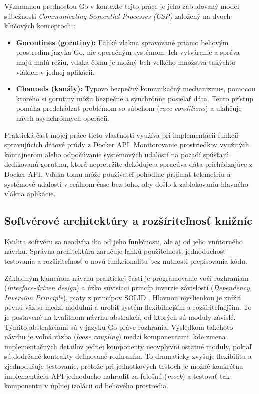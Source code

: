 \documentclass[
 program=infpvs,
  language=slovak,
  figures=false,
  tables=false,
  sourcecodes,
  glossaries,
  index
]{kidiplom}
\begin{document}
{Významnou prednosťou Go v kontexte tejto práce je jeho zabudovaný model súbežnosti \textit{Communicating Sequential Processes (CSP)} \cite{hoare-csp} založený na dvoch kľučových konceptoch \cite{go-concurrency}:
\begin{itemize}
    \item \textbf{Goroutines (gorutiny):} Ľahké vlákna spravované priamo behovým prostredím jazyka Go, nie operačným systémom. Ich vytváranie a správa majú malú réžiu, vďaka čomu je možný beh veľkého množstva takýchto vlákien v jednej aplikácii.
    \item \textbf{Channels (kanály):} Typovo bezpečný komunikačný mechanizmus, pomocou ktorého si gorutiny môžu bezpečne a synchrónne posielať dáta. Tento prístup pomáha predchádzať problémom so súbehom (\textit{race conditions}) a uľahčuje návrh asynchrónnych operácií.
\end{itemize}

Praktická časť mojej práce tieto vlastnosti využíva pri implementácii funkcií spravujúcich dátové prúdy z Docker API. Monitorovanie prostriedkov využitých kontajnerom alebo odpočúvanie systémových udalostí na pozadí spúšťajú dedikovanú gorutinu, ktorá nepretržite dekóduje a spracúva dáta prichádzajúce z Docker API. Vďaka tomu môže používateľ pohodlne prijímať telemetriu a systémové udalosti v reálnom čase bez toho, aby došlo k zablokovaniu hlavného vlákna aplikácie.



\subsection{Softvérové architektúry a rozšíriteľnosť knižníc}  \label{sec:soft-architektury}
Kvalita softvéru sa neodvíja iba od jeho funkčnosti, ale aj od jeho vnútorného návrhu. Správna architektúra zaručuje ľahkú použiteľnosť, jednoduchosť testovania a rozšíriteľnosť o novú funkcionalitu bez nutnosti prepisovania kódu.

Základným kameňom návrhu praktickej časti je programovanie voči rozhraniam (\textit{interface-driven design}) a úzko súvisiaci princíp inverzie závislostí (\textit{Dependency Inversion Principle}), piaty z princípov SOLID \cite{clean-architecture}. Hlavnou myšlienkou je znížiť pevnú väzbu medzi modulmi a urobiť systém flexibilnejším a rozšíriteľnejším. To je postavené na kvalitnom návrhu abstrakcií, od ktorých sú moduly závislé. Týmito abstrakciami sú v jazyku Go práve rozhrania. Výsledkom takéhoto návrhu je voľná väzba (\textit{loose coupling}) medzi komponentami, kde zmena implementačných detailov jednej komponenty neovplyvní ostatné moduly, pokiaľ sú dodržané kontrakty definované rozhraním. To dramaticky zvyšuje flexibilitu a zjednodušuje testovanie, pretože pri jednotkových testoch je možné konkrétnu implementáciu API jednoducho nahradiť za falošnú (\textit{mock}) a testovať tak komponentu v úplnej izolácii od behového prostredia.

}
\end{document}
